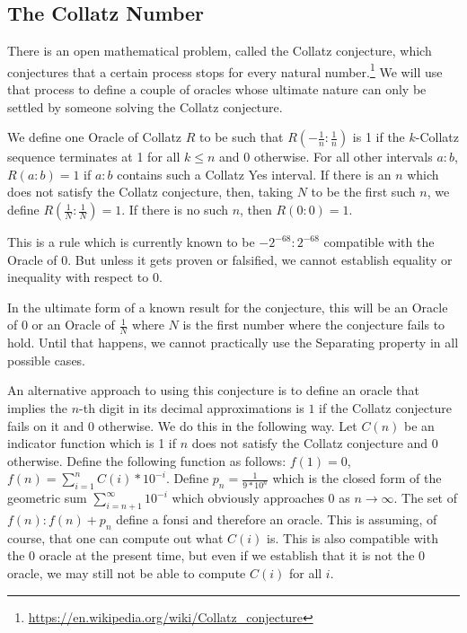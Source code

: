 \documentclass[12pt]{article}
\begin{document}
\subsection{The Collatz Number}

There is an open mathematical problem, called the Collatz conjecture, which conjectures that a certain process stops for every natural number.\footnote{\url{https://en.wikipedia.org/wiki/Collatz_conjecture}} We will use that process to define a couple of oracles whose ultimate nature can only be settled by someone solving the Collatz conjecture. 

We define one Oracle of Collatz $R$ to be such that $R(-\tfrac{1}{n}:\tfrac{1}{n})$ is 1 if the $k$-Collatz sequence terminates at 1 for all $k \leq n$ and 0 otherwise. For all other intervals $a:b$, $R(a:b) = 1$ if $a:b$ contains such a Collatz Yes interval. If there is an $n$ which does not satisfy the Collatz conjecture, then, taking $N$ to be the first such $n$, we define $R(\tfrac{1}{N}:\tfrac{1}{N}) = 1$. If there is no such $n$, then $R(0:0) = 1$.

This is a rule which is currently known to be $-2^{-68}:2^{-68}$ compatible with the Oracle of 0. But unless it gets proven or falsified, we cannot establish equality or inequality with respect to 0. 

In the ultimate form of a known result for the conjecture, this will be an Oracle of 0 or an Oracle of $\tfrac{1}{N}$ where $N$ is the first number where the conjecture fails to hold. Until that happens, we cannot practically use the Separating property in all possible cases. 

An alternative approach to using this conjecture is to define an oracle that implies the $n$-th digit in its decimal approximations is $1$ if the Collatz conjecture fails on it and $0$ otherwise. We do this in the following way. Let $C(n)$ be an indicator function which is 1 if $n$ does not satisfy the Collatz conjecture and 0 otherwise. Define the following function as follows: $f(1) = 0$,  $f(n) = \sum_{i=1}^n C(i)*10^{-i} $. Define $p_n = \frac{1}{9*10^n}$ which is the closed form of the geometric sum $\sum_{i=n+1}^{\infty} 10^{-i}$ which obviously approaches $0$ as $n \to \infty$. The set of $f(n): f(n) + p_n $ define a fonsi and therefore an oracle. This is assuming, of course, that one can compute out what $C(i)$ is. This is also compatible with the 0 oracle at the present time, but even if we establish that it is not the 0 oracle, we may still not be able to compute $C(i)$ for all $i$. 
\end{document}
